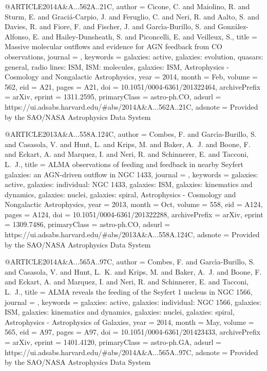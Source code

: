 \documentclass[longauth]{aa}
\begin{document}
@ARTICLE{2014A&A...562A..21C,
       author = {{Cicone}, C. and {Maiolino}, R. and {Sturm}, E. and {Graci{\'a}-Carpio}, J. and {Feruglio}, C. and {Neri}, R. and {Aalto}, S. and {Davies}, R. and {Fiore}, F. and {Fischer}, J. and {Garc{\'\i}a-Burillo}, S. and {Gonz{\'a}lez-Alfonso}, E. and {Hailey-Dunsheath}, S. and {Piconcelli}, E. and {Veilleux}, S.},
        title = {Massive molecular outflows and evidence for AGN feedback from CO observations},
      journal = {\aap},
     keywords = {galaxies: active, galaxies: evolution, quasars: general, radio lines:
        ISM, ISM: molecules, galaxies: ISM, Astrophysics - Cosmology and Nongalactic Astrophysics},
         year = 2014,
        month = Feb,
       volume = {562},
          eid = {A21},
        pages = {A21},
          doi = {10.1051/0004-6361/201322464},
archivePrefix = {arXiv},
       eprint = {1311.2595},
 primaryClass = {astro-ph.CO},
       adsurl = {https://ui.adsabs.harvard.edu/#abs/2014A&A...562A..21C},
      adsnote = {Provided by the SAO/NASA Astrophysics Data System}
}

@ARTICLE{2013A&A...558A.124C,
       author = {{Combes}, F. and {Garc{\'\i}a-Burillo}, S. and {Casasola}, V. and {Hunt}, L. and {Krips}, M. and {Baker}, A.~J. and {Boone}, F. and {Eckart}, A. and {Marquez}, I. and {Neri}, R. and {Schinnerer}, E. and {Tacconi}, L.~J.},
        title = {ALMA observations of feeding and feedback in nearby Seyfert galaxies: an AGN-driven outflow in NGC 1433},
      journal = {\aap},
     keywords = {galaxies: active, galaxies: individual: NGC 1433, galaxies: ISM, galaxies: kinematics and dynamics, galaxies: nuclei, galaxies: spiral, Astrophysics - Cosmology and Nongalactic Astrophysics},
         year = 2013,
        month = Oct,
       volume = {558},
          eid = {A124},
        pages = {A124},
          doi = {10.1051/0004-6361/201322288},
archivePrefix = {arXiv},
       eprint = {1309.7486},
 primaryClass = {astro-ph.CO},
       adsurl = {https://ui.adsabs.harvard.edu/#abs/2013A&A...558A.124C},
      adsnote = {Provided by the SAO/NASA Astrophysics Data System}
}

@ARTICLE{2014A&A...565A..97C,
       author = {{Combes}, F. and {Garc{\'\i}a-Burillo}, S. and {Casasola}, V. and {Hunt}, L.~K. and {Krips}, M. and {Baker}, A.~J. and {Boone}, F. and {Eckart}, A. and {Marquez}, I. and {Neri}, R. and {Schinnerer}, E. and {Tacconi}, L.~J.},
       title = {ALMA reveals the feeding of the Seyfert 1 nucleus in NGC 1566},
      journal = {\aap},
     keywords = {galaxies: active, galaxies: individual: NGC 1566, galaxies: ISM, galaxies: kinematics and dynamics, galaxies: nuclei, galaxies: spiral, Astrophysics - Astrophysics of Galaxies},
         year = 2014,
        month = May,
       volume = {565},
          eid = {A97},
        pages = {A97},
          doi = {10.1051/0004-6361/201423433},
archivePrefix = {arXiv},
       eprint = {1401.4120},
 primaryClass = {astro-ph.GA},
       adsurl = {https://ui.adsabs.harvard.edu/#abs/2014A&A...565A..97C},
      adsnote = {Provided by the SAO/NASA Astrophysics Data System}
}
\end{document}

